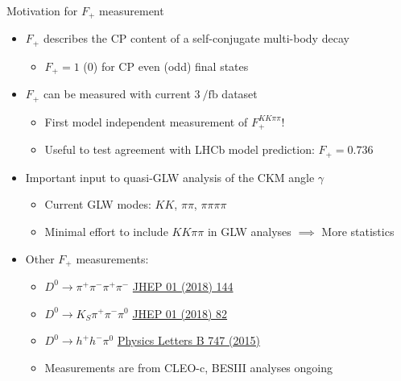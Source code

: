 \documentclass{beamer}
\begin{document}
\begin{frame}{Motivation for $F_+$ measurement}
  \begin{itemize}
    \setlength\itemsep{1.0em}
    \item{$F_+$ describes the CP content of a self-conjugate multi-body decay}
    \begin{itemize}
      \item{$F_+ = 1$ ($0$) for CP even (odd) final states}
    \end{itemize}
    \item{$F_+$ can be measured with current $\SI{3}{\per\femto\barn}$ dataset}
    \begin{itemize}
      \item{First model independent measurement of $F_+^{KK\pi\pi}$!}
      \item{Useful to test agreement with LHCb model prediction: $F_+ = 0.736$}
    \end{itemize}
    \item{Important input to quasi-GLW analysis of the CKM angle $\gamma$}
    \begin{itemize}
      \item{Current GLW modes: $KK$, $\pi\pi$, $\pi\pi\pi\pi$}
      \item{Minimal effort to include $KK\pi\pi$ in GLW analyses $\implies$ More statistics}
    \end{itemize}
    \item{Other $F_+$ measurements:}
    \begin{itemize}
      \item{$D^0\to\pi^+\pi^-\pi^+\pi^-$ \href{https://arxiv.org/abs/1709.03467}{JHEP 01 (2018) 144}}
      \item{$D^0\to K_S\pi^+\pi^-\pi^0$ \href{https://arxiv.org/abs/1710.10086}{JHEP 01 (2018) 82}}
      \item{$D^0\to h^+h^-\pi^0$ \href{https://arxiv.org/abs/1504.05878}{Physics Letters B 747 (2015)}}
      \item{Measurements are from CLEO-c, BESIII analyses ongoing}
    \end{itemize}
  \end{itemize}
\end{frame}
\end{document}
